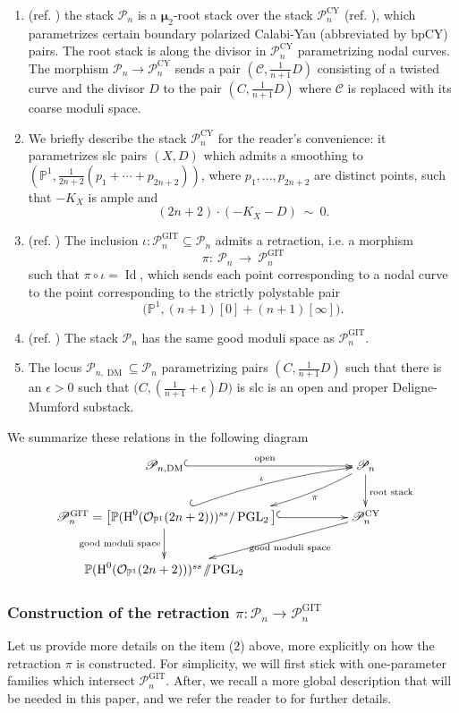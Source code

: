 \documentclass[a4paper,12pt]{amsart}
\DeclareMathOperator{\PGL}{PGL}
\DeclareMathOperator{\CY}{CY}
\DeclareMathOperator{\Id}{Id}
\DeclareMathOperator{\GIT}{GIT}
\newcommand{\sslash}{\mathbin{\mkern-3mu/\mkern-6mu/\mkern-3mu}}
\newcommand{\bP}{{\mathbb P}}
\newcommand{\sP}{{\mathscr{P}}}
\newcommand{\cO}{{\mathcal{O}}}
\newcommand{\bmu}{\bm{\mu}}
\newcommand{\oH}{{\operatorname{H}}}
\newcommand\cC{{\mathcal{C}}}
\newcommand{\dm}{{\operatorname{DM}}}
\theoremstyle{definition}
\theoremstyle{remark}
\begin{document}
\begin{enumerate}
\item (ref. \cite[Proposition A.7]{twisted_map_2}) the stack $\sP_n$ is a $\bmu_2$-root stack over the stack $\sP_{n}^{\CY}$ (ref. \cite[Definition 16.7]{ABBDILW23}), which parametrizes certain boundary polarized Calabi-Yau (abbreviated by bpCY) pairs. The root stack is along the divisor in $\sP_{n}^{\CY}$ parametrizing nodal curves. The morphism $\sP_n\to \sP_{n}^{\CY}$ sends a pair $(\cC,\frac{1}{n+1}D)$ consisting of a twisted curve and the divisor $D$ to the pair $(C,\frac{1}{n+1}D)$ where $\cC$ is replaced with its coarse moduli space. 
\item[(1$^{+}$)] We briefly describe the stack $\sP_{n}^{\CY}$ for the reader's convenience: it parametrizes slc pairs $(X,D)$ which admits a smoothing to $(\bP^1,\frac{1}{2n+2}(p_1+\cdots+p_{2n+2}))$, where $p_1,...,p_{2n+2}$ are distinct points, such that $-K_X$ is ample and $$(2n+2)\cdot (-K_X-D)\ \sim\  0 .$$
    \item\label{item_where_we_say_there_is_a_map_spn_to_tilde_pn} (ref. \cite[Theorem A.4(1)]{twisted_map_2}) The inclusion $\iota:\sP_n^{\GIT}\subseteq \sP_n$ admits a retraction, i.e. a morphism $$\pi:\ \sP_n \ \longrightarrow \ \sP_n^{\GIT}$$ such that $\pi\circ\iota=\Id$, which sends each point corresponding to a nodal curve to the point corresponding to the strictly polystable pair $$\big(\bP^1,(n+1)[0]+(n+1)[\infty]\big).$$
\item\label{same_gms_for_wideP_and_P} (ref. \cite[Corollary A.8]{twisted_map_2}) The stack $\sP_n$ has the same good moduli space as $\sP_n^{\GIT}$.
    \item The locus $\sP_{n,\dm}\subseteq \sP_n$ parametrizing pairs $(C,\frac{1}{n+1}D)$ such that there is an $\epsilon>0$ such that $\big(C,(\frac{1}{n+1}+\epsilon)D\big)$ is slc is an open and proper Deligne-Mumford substack.
\end{enumerate}
We summarize these relations in the following diagram
\[\xymatrix{\sP_{n,\dm} \ar@{^{(}->}[rr]^{\text{open}} & &\sP_n\ar[d]^{\text{root stack}}  \ar@/^1.0pc/@[black][dll]^-\pi\\
\ \sP_n^{\GIT} = \big[\bP(\oH^0(\cO_{\bP^1}(2n + 2)))^{ss}/\PGL_2\big] \ar@{^{(}->}[rr] \ar@/^0.5pc/@{^{(}->}[rru]^{\iota}\ar[d]_{\text{good moduli space}} & & \sP_{n}^{\CY} \ar[dll]^-{\text{good moduli space}} \\   \bP(\oH^0(\cO_{\bP^1}(2n + 2)))^{ss} \sslash\PGL_2 & &  }
\]


\subsubsection{Construction of the retraction $\pi\colon \sP_n\to \sP_n^{\GIT}$}\label{subsubsection_recalling_how_to_take_ruled_model_in_qmap_paper}
Let us provide more details on the item (2) above, more explicitly on how the retraction $\pi$ is constructed. For simplicity, we will first stick with one-parameter families which intersect $\sP_n^{\GIT}$. After, we recall a more global description that will be needed in this paper, and we refer the reader to \cite[Theorem A.4(1)]{twisted_map_2} for further details.
\end{document}
